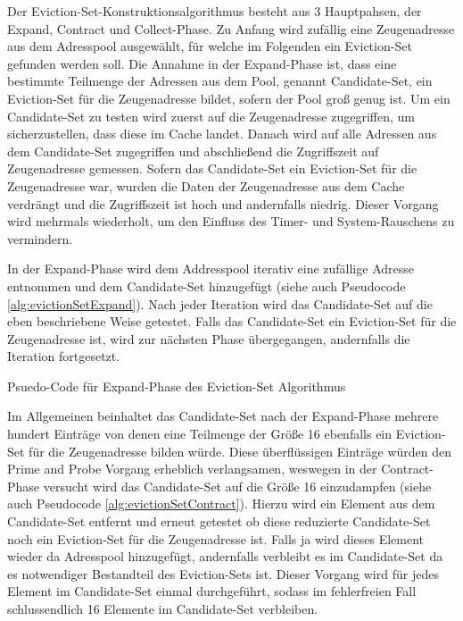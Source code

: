 Der Eviction-Set-Konstruktionsalgorithmus besteht aus 3 Hauptpahsen, der Expand, Contract und Collect-Phase. 
Zu Anfang wird zufällig eine Zeugenadresse aus dem Adresspool ausgewählt, für welche im Folgenden ein Eviction-Set gefunden werden soll.
Die Annahme in der Expand-Phase ist, dass eine bestimmte Teilmenge der Adressen aus dem Pool, genannt Candidate-Set, ein Eviction-Set für die Zeugenadresse bildet, sofern der Pool groß genug ist.
Um ein Candidate-Set zu testen wird zuerst auf die Zeugenadresse zugegriffen, um sicherzustellen, dass diese im Cache landet.
Danach wird auf alle Adressen aus dem Candidate-Set zugegriffen und abschließend die Zugriffszeit auf Zeugenadresse gemessen. 
Sofern das Candidate-Set ein Eviction-Set für die Zeugenadresse war, wurden die Daten der Zeugenadresse aus dem Cache verdrängt und die Zugriffszeit ist hoch und andernfalls niedrig.
Dieser Vorgang wird mehrmals wiederholt, um den Einfluss des Timer- und System-Rauschens zu vermindern.

In der Expand-Phase wird dem Addresspool iterativ eine zufällige Adresse entnommen und dem Candidate-Set hinzugefügt (siehe auch Pseudocode \ref{alg:evictionSetExpand}). 
Nach jeder Iteration wird das Candidate-Set auf die eben beschriebene Weise getestet.
Falls das Candidate-Set ein Eviction-Set für die Zeugenadresse ist, wird zur nächsten Phase übergegangen, andernfalls die Iteration fortgesetzt.

\begin{algorithm}[h]
\DontPrintSemicolon
\caption{Psuedo-Code für Expand-Phase des Eviction-Set Algorithmus}
\label{alg:evictionSetExpand}

\end{algorithm}

Im Allgemeinen beinhaltet das Candidate-Set nach der Expand-Phase mehrere hundert Einträge von denen eine Teilmenge der Größe 16 ebenfalls ein Eviction-Set für die Zeugenadresse bilden würde.
Diese überflüssigen Einträge würden den Prime and Probe Vorgang erheblich verlangsamen, weswegen in der Contract-Phase versucht wird das Candidate-Set auf die Größe 16 einzudampfen (siehe auch Pseudocode \ref{alg:evictionSetContract}).
Hierzu wird ein Element aus dem Candidate-Set entfernt und erneut getestet ob diese reduzierte Candidate-Set noch ein Eviction-Set für die Zeugenadresse ist.
Falls ja wird dieses Element wieder da Adresspool hinzugefügt, andernfalls verbleibt es im Candidate-Set da es  notwendiger Bestandteil des Eviction-Sets ist.
Dieser Vorgang wird für jedes Element im Candidate-Set einmal durchgeführt, sodass im fehlerfreien Fall schlussendlich 16 Elemente im Candidate-Set verbleiben.

